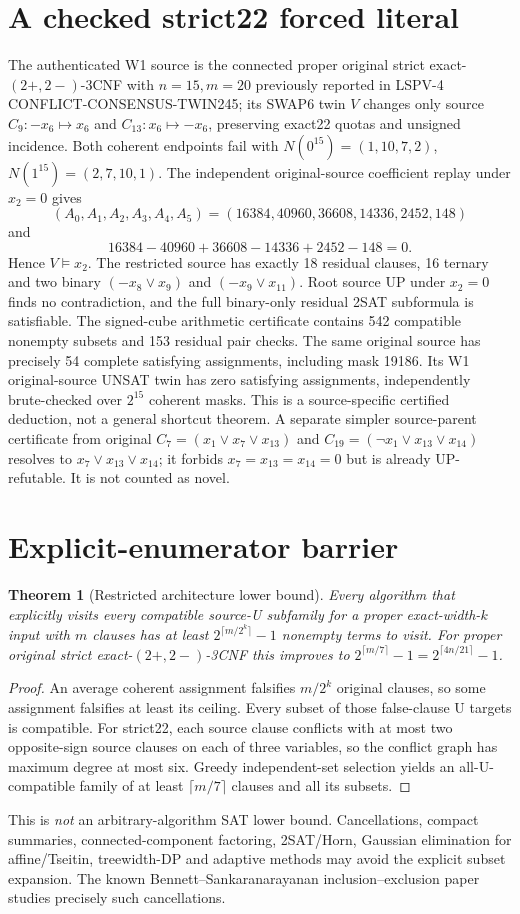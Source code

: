 \documentclass[10pt]{article}
\newtheorem{theorem}{Theorem}
\begin{document}
\section{A checked strict22 forced literal}
The authenticated W1 source is the connected proper original strict exact-$(2+,2-)$-3CNF with $n=15,m=20$ previously reported in LSPV-4 CONFLICT-CONSENSUS-TWIN245; its SWAP6 twin $V$ changes only source $C_9:-x_6\mapsto x_6$ and $C_{13}:x_6\mapsto-x_6$, preserving exact22 quotas and unsigned incidence. Both coherent endpoints fail with
$N(0^{15})=(1,10,7,2)$, $N(1^{15})=(2,7,10,1)$.
The independent original-source coefficient replay under $x_2=0$ gives
\[
(A_0,A_1,A_2,A_3,A_4,A_5)
=(16384,40960,36608,14336,2452,148)
\]
and
\[
16384-40960+36608-14336+2452-148=0.
\]
Hence $V\models x_2$. The restricted source has exactly 18 residual clauses, 16 ternary and two binary $(-x_8\vee x_9)$ and $(-x_9\vee x_{11})$. Root source UP under $x_2=0$ finds no contradiction, and the full binary-only residual 2SAT subformula is satisfiable. The signed-cube arithmetic certificate contains 542 compatible nonempty subsets and 153 residual pair checks. The same original source has precisely 54 complete satisfying assignments, including mask 19186. Its W1 original-source UNSAT twin has zero satisfying assignments, independently brute-checked over $2^{15}$ coherent masks. This is a source-specific certified deduction, not a general shortcut theorem.
A separate simpler source-parent certificate from original $C_7=(x_1\vee x_7\vee x_{13})$ and $C_{19}=(\neg x_1\vee x_{13}\vee x_{14})$ resolves to $x_7\vee x_{13}\vee x_{14}$; it forbids $x_7=x_{13}=x_{14}=0$ but is already UP-refutable. It is not counted as novel.

\section{Explicit-enumerator barrier}
\begin{theorem}[Restricted architecture lower bound]
Every algorithm that \emph{explicitly} visits every compatible source-U subfamily for a proper exact-width-$k$ input with $m$ clauses has at least $2^{\lceil m/2^k\rceil}-1$ nonempty terms to visit. For proper original strict exact-$(2+,2-)$-3CNF this improves to $2^{\lceil m/7\rceil}-1=2^{\lceil 4n/21\rceil}-1$.
\end{theorem}
\begin{proof}
An average coherent assignment falsifies $m/2^k$ original clauses, so some assignment falsifies at least its ceiling. Every subset of those false-clause U targets is compatible. For strict22, each source clause conflicts with at most two opposite-sign source clauses on each of three variables, so the conflict graph has maximum degree at most six. Greedy independent-set selection yields an all-U-compatible family of at least $\lceil m/7\rceil$ clauses and all its subsets.
\end{proof}
This is \emph{not} an arbitrary-algorithm SAT lower bound. Cancellations, compact summaries, connected-component factoring, 2SAT/Horn, Gaussian elimination for affine/Tseitin, treewidth-DP and adaptive methods may avoid the explicit subset expansion. The known Bennett--Sankaranarayanan inclusion--exclusion paper studies precisely such cancellations.
\end{document}
